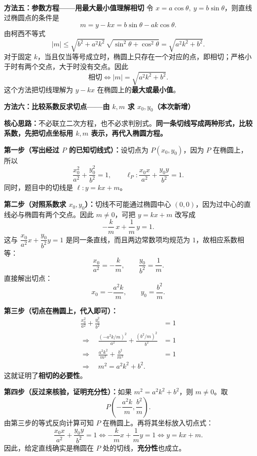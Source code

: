\begin{proofbox}
\medskip
\textbf{\textcolor{CProof}{方法五：参数方程——用最大最小值理解相切}}
令 $x=a\cos\theta,\ y=b\sin\theta$，则直线过椭圆点的条件是
\[
 m=y-kx=b\sin\theta-ak\cos\theta.
\]
由柯西不等式
\[
 |m|\le\sqrt{b^2+a^2k^2}\,
 \sqrt{\sin^2\theta+\cos^2\theta}
 =\sqrt{a^2k^2+b^2}.
\]
对于固定 $k$，当且仅当等号成立时，椭圆上只存在一个对应的点，即相切；严格小于时有两个交点，大于时没有交点。因此
\[
 \boxed{\text{相切}\iff |m|=\sqrt{a^2k^2+b^2}.}
\]
这个方法把切线理解为 $y-kx$ 在椭圆上的\textbf{最大或最小值}。

\medskip

\medskip
\textbf{\textcolor{CProof}{方法六：比较系数反求切点——由 $k,m$ 求 $x_0,y_0$（本次新增）}}

\textbf{核心思路：}不必联立二次方程，也不必求判别式。\textbf{同一条切线写成两种形式，比较系数，先把切点坐标用 $k,m$ 表示，再代入椭圆方程。}

\textbf{第一步（写出经过 $P$ 的已知切线式）：}设切点为 $P(x_0,y_0)$，因为 $P$ 在椭圆上，所以
\[
 \frac{x_0^2}{a^2}+\frac{y_0^2}{b^2}=1,
 \qquad \ell_P:\frac{x_0x}{a^2}+\frac{y_0y}{b^2}=1.
\]
同时，题目中的切线是 $\ell:y=kx+m$。

\textbf{第二步（对照系数求 $x_0,y_0$）：}切线不可能通过椭圆中心 $(0,0)$，因为过中心的直线必与椭圆有两个交点。因此 $m\ne0$，可把 $y=kx+m$ 改写成
\[
 -\frac{k}{m}\,x+\frac1m\,y=1.
\]
这与 $\dfrac{x_0}{a^2}x+\dfrac{y_0}{b^2}y=1$ 是同一条直线，而且两边常数项均规范为 $1$，故相应系数相等：
\[
 \frac{x_0}{a^2}=-\frac{k}{m},\qquad
 \frac{y_0}{b^2}=\frac1m.
\]
直接解出切点：
\[
 \boxed{x_0=-\frac{a^2k}{m},\qquad y_0=\frac{b^2}{m}.}
\]

\textbf{第三步（切点在椭圆上，代入即可）：}
\[
\begin{aligned}
 \frac{x_0^2}{a^2}+\frac{y_0^2}{b^2}&=1\\
 \Longrightarrow\quad
 \frac{(-a^2k/m)^2}{a^2}+\frac{(b^2/m)^2}{b^2}&=1\\
 \Longrightarrow\quad \frac{a^2k^2}{m^2}+\frac{b^2}{m^2}&=1\\
 \Longrightarrow\quad \boxed{m^2=a^2k^2+b^2}.&
\end{aligned}
\]
这就证明了\textbf{相切的必要性}。

\textbf{第四步（反过来核验，证明充分性）：}如果 $m^2=a^2k^2+b^2$，则 $m\ne0$。取
\[
 P\left(-\frac{a^2k}{m},\frac{b^2}{m}\right).
\]
由第三步的等式反向计算可知 $P$ 在椭圆上。再将其坐标放入切点式：
\[
 \frac{x_0x}{a^2}+\frac{y_0y}{b^2}=1
 \iff -\frac{k}{m}x+\frac{1}{m}y=1
 \iff y=kx+m.
\]
因此，给定直线确实是椭圆在 $P$ 处的切线，\textbf{充分性}也成立。


\end{proofbox}
